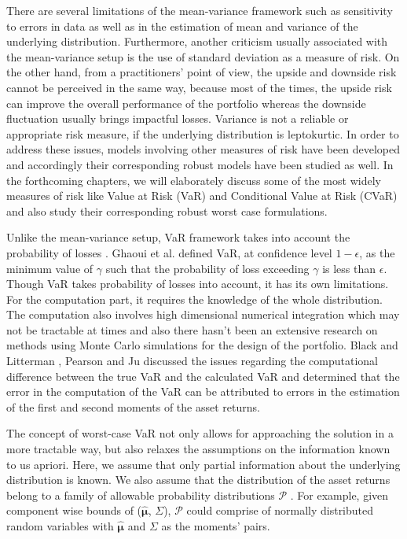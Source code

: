 \documentclass[12pt]{article}
\numberwithin{equation}{section}
\begin{document}
There are several limitations of the mean-variance framework such as sensitivity to errors in data as well as in the estimation of mean and variance of the underlying distribution. Furthermore, another criticism usually associated with the mean-variance setup is the use of standard deviation as a measure of risk. On the other hand, from a practitioners' point of view, the upside and downside risk cannot be perceived in the same way, because most of the times, the upside risk can improve the overall performance of the portfolio whereas the downside fluctuation usually brings impactful losses. Variance is not a reliable or appropriate  risk measure, if the underlying distribution is leptokurtic. In order to address these issues, models involving other measures of risk have been developed and accordingly their corresponding robust models have been studied as well. In the forthcoming chapters, we will elaborately discuss some of the most widely measures of risk like Value at Risk (VaR) and Conditional Value at Risk (CVaR) and also study their corresponding robust worst case formulations.

Unlike the mean-variance setup, VaR framework takes into account the probability of losses \cite{var96}. Ghaoui et al. \cite{ghaoui03} defined VaR, at confidence level $1-\epsilon$, as the minimum value of $\gamma$ such that the probability of loss exceeding $\gamma$ is less than $\epsilon$. Though VaR takes probability of losses into account, it has its own limitations. For the computation part, it requires the knowledge of the whole distribution. The computation also involves high dimensional numerical integration which may not be tractable at times and also there hasn't been an extensive research on methods using Monte Carlo simulations \cite{var96} for the design of the portfolio. Black and Litterman \cite{Black}, Pearson and Ju \cite{ju98} discussed the issues regarding the computational difference between the true VaR and the calculated VaR and determined that the error in the computation of the VaR can be attributed to errors in the estimation of the first and second moments of the asset returns.

The concept of worst-case VaR not only allows for approaching the solution in a more tractable way, but also relaxes the assumptions on the information known to us apriori. Here, we assume that only partial information about the underlying distribution is known. We also assume that the distribution of the asset returns belong to a family of allowable probability distributions $\mathcal{P}$ \cite{ghaoui03}. For example, given component wise bounds of ($\hat{\boldsymbol{\mu}}$,  $\Sigma$), $\mathcal{P}$ could comprise of normally distributed random variables with $\hat{\boldsymbol{\mu}}$ and $\Sigma$ as the moments' pairs.
\end{document}
